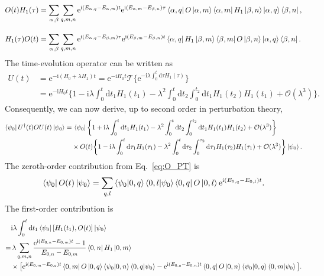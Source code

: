 \documentclass[aps,prl,reprint,twocolumn,superscriptaddress,floatfix,nofootinbib]{revtex4-1}
\def\d{\mathrm d}
\def\d{\mathrm d}
\begin{document}
\begin{align}\label{eq:OH}
O(t)H_1(\tau)&=\sum_{\alpha,\beta}\sum_{q,m,n}\mathrm{e}^{\mathrm{i}(E_{\alpha,q}-E_{\alpha,m})t}\mathrm{e}^{\mathrm{i}(E_{\alpha,m}-E_{\beta,n})\tau}\bra{\alpha,q}O\ket{\alpha,m}\bra{\alpha,m}H_1\ket{\beta,n}\ket{\alpha,q}\bra{\beta,n},\\[1em]\label{eq:HO}
H_1(\tau)O(t)&=\sum_{\alpha,\beta}\sum_{q,m,n}\mathrm{e}^{\mathrm{i}(E_{\alpha,q}-E_{\beta,m})\tau}\mathrm{e}^{\mathrm{i}(E_{\beta,m}-E_{\beta,n})t}\bra{\alpha,q}H_1\ket{\beta,m}\bra{\beta,m}O\ket{\beta,n}\ket{\alpha,q}\bra{\beta,n}.
\end{align}
The time-evolution operator can be written as
\begin{align}\nonumber
U(t)&=\mathrm{e}^{-\mathrm{i}(H_0+\lambda H_1)t}=\mathrm{e}^{-\mathrm{i}H_0t}\mathcal{T}\big\{\mathrm{e}^{-\mathrm{i}\lambda\int_0^t \d\tau H_1(\tau)}\big\}\\\label{eq:U}
&=\mathrm{e}^{-\mathrm{i}H_0t}\bigg\{1-\mathrm{i}\lambda\int_0^t\d t_1H_1(t_1)-\lambda^2\int_0^t\d t_2\int_0^{t_2}\d t_1H_1(t_2)H_1(t_1)+\mathcal{O}(\lambda^3)\bigg\}.
\end{align}
Consequently, we can now derive, up to second order in perturbation theory,
\begin{align}\nonumber
\bra{\psi_0}U^\dagger(t)OU(t)\ket{\psi_0}=&\,\bra{\psi_0}\bigg\{1+\mathrm{i}\lambda\int_0^t\d t_1H_1(t_1)-\lambda^2\int_0^t\d t_2\int_0^{t_2}\d t_1H_1(t_1)H_1(t_2)+\mathcal{O}(\lambda^3)\bigg\}\\\label{eq:O_PT}
&\times O(t)\bigg\{1-\mathrm{i}\lambda\int_0^t\d \tau_1H_1(\tau_1)-\lambda^2\int_0^t\d \tau_2\int_0^{\tau_2}\d \tau_1H_1(\tau_2)H_1(\tau_1)+\mathcal{O}(\lambda^3)\bigg\}\ket{\psi_0}.
\end{align}
The zeroth-order contribution from Eq.~\eqref{eq:O_PT} is
\begin{align}\label{eq:ZerothOrderPT}
\bra{\psi_0}O(t)\ket{\psi_0}=\sum_{q,l}\bra{\psi_0}\ket{0,q}\bra{0,l}\ket{\psi_0}\bra{0,q}O\ket{0,l}\mathrm{e}^{\mathrm{i}(E_{0,q}-E_{0,l})t}.
\end{align}
The first-order contribution is
\begin{align}\nonumber
&\mathrm{i}\lambda\int_0^t\d t_1\bra{\psi_0}[H_1(t_1),O(t)]\ket{\psi_0}\\\nonumber
=&\,\lambda\sum_{q,m,n}\frac{\mathrm{e}^{\mathrm{i}(E_{0,n}-E_{0,m})t}-1}{E_{0,n}-E_{0,m}}\bra{0,n}H_1\ket{0,m}\\\label{eq:FirstOrderPT}
&\times\big[\mathrm{e}^{\mathrm{i}(E_{0,m}-E_{0,q})t}\bra{0,m}O\ket{0,q}\bra{\psi_0}\ket{0,n}\bra{0,q}\ket{\psi_0}-\mathrm{e}^{\mathrm{i}(E_{0,q}-E_{0,n})t}\bra{0,q}O\ket{0,n}\bra{\psi_0}\ket{0,q}\bra{0,m}\ket{\psi_0}\big].
\end{align}
\end{document}
